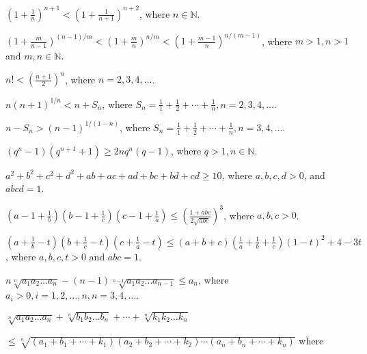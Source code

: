 \item $\left(1 + \frac{1}{n}\right)^{n + 1} < \left(1 + \frac{1}{n + 1}\right)^{n + 2}$, where $n\in\mathbb{N}$.
\item $\left(1 + \frac{m}{n - 1}\right)^{(n - 1)/m} < \left(1 + \frac{m}{n}\right)^{n/m} < \left(1 + \frac{m - 1}{n}\right)^{n/(m
  - 1)}$, where $m > 1, n > 1$ and $m,n \in\mathbb{N}$.
\item $n!< \left(\frac{n + 1}{2}\right)^n$, where $n = 2, 3, 4, \ldots$.
\item $n(n + 1)^{1/n} < n + S_n$, where $S_n = \frac{1}{1} + \frac{1}{2} + \cdots + \frac{1}{n}, n = 2, 3, 4, \ldots$.
\item $n - S_n > (n - 1)^{1/(1 - n)}$, where $S_n = \frac{1}{1} + \frac{1}{2} + \cdots + \frac{1}{n}, n = 3, 4, \ldots$.
\item $(q^n - 1)(q^{n + 1} + 1)\geq 2nq^n(q - 1)$, where $q > 1, n \in\mathbb{N}$.
\item $a^2 + b^2 + c^2 + d^2 + ab + ac + ad + bc + bd + cd\geq 10$, where $a, b, c, d>0$, and $abcd = 1$.
\item $\left(a - 1 + \frac{1}{b}\right)\left(b - 1 + \frac{1}{c}\right)\left(c - 1 + \frac{1}{a}\right)\leq \left(\frac{1 +
  abc}{2\sqrt{abc}}\right)^3$, where $a, b, c> 0$.
\item $\left(a + \frac{1}{b} - t\right)\left(b + \frac{1}{c} - t\right)\left(c + \frac{1}{a} - t\right)\leq (a + b +
  c)\left(\frac{1}{a} + \frac{1}{b} + \frac{1}{c}\right)(1 - t)^2 + 4 - 3t$, where $a, b,c, t > 0$ and $abc = 1$.
\item $n\sqrt[n]{a_1a_2\ldots a_n} - (n - 1)\sqrt[n - 1]{a_1a_2\ldots a_{n - 1}} \leq a_n$, where $a_i > 0, i = 1, 2,
  \ldots, n, n = 3, 4, \ldots$.
\item $\sqrt[n]{a_1a_2\ldots a_n} + \sqrt[n]{b_1b_2\ldots b_n} + \cdots + \sqrt[n]{k_1k_2\ldots k_n}$

  $\leq\sqrt[n]{(a_1 + b_1 + \cdots + k_1)(a_2 + b_2 + \cdots + k_2)\cdots(a_n + b_n + \cdots + k_n)}$ where

